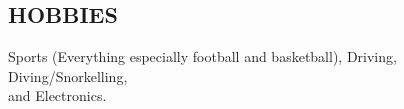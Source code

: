 \documentclass[line,margin]{res}
\begin{document}
\begin{resume}
\section{HOBBIES}
    Sports (Everything especially football and basketball), Driving,
    Diving/Snorkelling, \\ and Electronics.
 
\end{resume}
\end{document}
